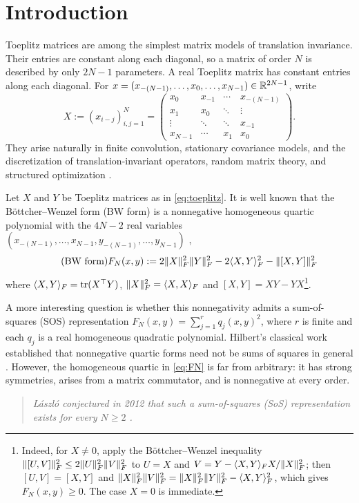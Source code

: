\section{Introduction}\label{sec:introduction}

Toeplitz matrices are among the simplest matrix models of translation invariance. Their entries are constant along each diagonal, so a matrix of order $N$ is described by only $2N-1$ parameters.
A real Toeplitz matrix has constant entries along each diagonal. For
$x=(x_{-(N-1)},\ldots,x_0,\ldots,x_{N-1})\in\mathbb{R}^{2N-1}$, write
\begin{equation}\label{eq:toeplitz}
 X:=(x_{i-j})_{i,j=1}^N=
 \begin{pmatrix}
  x_0 & x_{-1} & \cdots & x_{-(N-1)}\\
  x_1 & x_0 & \ddots & \vdots\\
  \vdots & \ddots & \ddots & x_{-1}\\
  x_{N-1} & \cdots & x_1 & x_0
 \end{pmatrix}.
\end{equation}
They arise naturally in finite convolution, stationary covariance models, and the discretization of translation-invariant operators,
random matrix theory, and structured optimization
\cite{gray2006,yelim2016,bryc2006}.

Let $X$ and $Y$ be Toeplitz matrices as in \eqref{eq:toeplitz}. It is well
known that the B\"ottcher--Wenzel form (BW form) is a nonnegative homogeneous quartic polynomial with the $4N-2$ real variables
$(x_{-(N-1)},\ldots,x_{N-1},y_{-(N-1)},\ldots,y_{N-1})$
\cite{bottcher2008,laszlo2012},
\begin{equation}\label{eq:FN}
\tag{BW form}
 F_N(x,y):=2\lVert X\rVert_F^2\lVert Y\rVert_F^2
          -2\langle X,Y\rangle_F^2-\lVert[X,Y]\rVert_F^2
\end{equation}
where
$\langle X,Y\rangle_F=\operatorname{tr}(X^\top Y)$,
$\lVert X\rVert_F^2=\langle X,X\rangle_F$ and $[X,Y]=XY-YX$\footnote{Indeed, for $X\ne0$, apply the B\"ottcher--Wenzel inequality
$
                  \lVert[U,V]\rVert_F^2\le2\lVert U\rVert_F^2\lVert V\rVert_F^2
$
to $U=X$ and $V=Y-\langle X,Y\rangle_FX/\lVert X\rVert_F^2$;
then $[U,V]=[X,Y]$ and
$\lVert X\rVert_F^2\lVert V\rVert_F^2=\lVert X\rVert_F^2\lVert Y\rVert_F^2-\langle X,Y\rangle_F^2$,
which gives $F_N(x,y)\ge0$. The case $X=0$ is immediate.}.

A more interesting question is whether this nonnegativity admits a
sum-of-squares (SOS) representation
$F_N(x,y)=\sum_{j=1}^{r}q_j(x,y)^2$,
where $r$ is finite and each $q_j$ is a real homogeneous quadratic
polynomial.
Hilbert's classical work established that nonnegative quartic forms
need not be sums of squares in general
\cite{hilbert1888darstellung,choi1995}.
However, the homogeneous quartic in \eqref{eq:FN} is far from arbitrary:
it has strong symmetries, arises from a matrix commutator, and is
nonnegative at every order.
\begin{quote}
\textit{L\'aszl\'o conjectured in 2012 that such a sum-of-squares
(SoS) representation exists for every $N\ge2$
\cite[Conjecture~15]{laszlo2012}.}
\end{quote}

